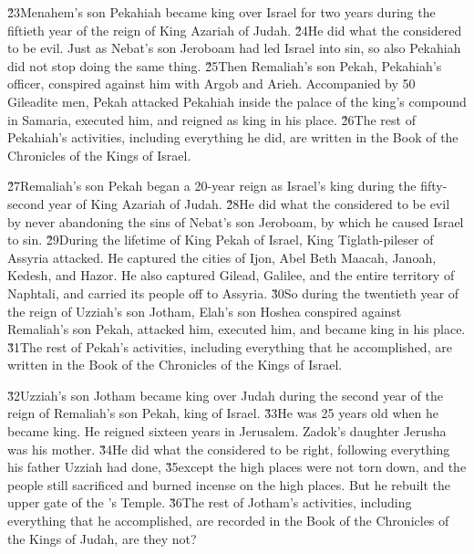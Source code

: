 \v{23}Menahem's son Pekahiah became king over Israel for two years during the fiftieth year of the reign of King Azariah of Judah. \v{24}He did what the  considered to be evil. Just as Nebat's son Jeroboam had led Israel into sin, so also Pekahiah did not stop doing the same thing. \v{25}Then Remaliah's son Pekah, Pekahiah's officer, conspired against him with Argob and Arieh. Accompanied by 50 Gileadite men, Pekah attacked Pekahiah inside the palace of the king's compound in Samaria, executed him, and reigned as king in his place. \v{26}The rest of Pekahiah's activities, including everything he did, are written in the Book of the Chronicles of the Kings of Israel.

\v{27}Remaliah's son Pekah began a 20-year reign as Israel's king during the fifty-second year of King Azariah of Judah. \v{28}He did what the  considered to be evil by never abandoning the sins of Nebat's son Jeroboam, by which he caused Israel to sin. \v{29}During the lifetime of King Pekah of Israel, King Tiglath-pileser of Assyria attacked. He captured the cities of Ijon, Abel Beth Maacah, Janoah, Kedesh, and Hazor. He also captured Gilead, Galilee, and the entire territory of Naphtali, and carried its people off to Assyria. \v{30}So during the twentieth year of the reign of Uzziah's son Jotham, Elah's son Hoshea conspired against Remaliah's son Pekah, attacked him, executed him, and became king in his place. \v{31}The rest of Pekah's activities, including everything that he accomplished, are written in the Book of the Chronicles of the Kings of Israel.

\v{32}Uzziah's son Jotham became king over Judah during the second year of the reign of Remaliah's son Pekah, king of Israel. \v{33}He was 25 years old when he became king. He reigned sixteen years in Jerusalem. Zadok's daughter Jerusha was his mother. \v{34}He did what the  considered to be right, following everything his father Uzziah had done, \v{35}except the high places were not torn down, and the people still sacrificed and burned incense on the high places. But he rebuilt the upper gate of the 's Temple. \v{36}The rest of Jotham's activities, including everything that he accomplished, are recorded in the Book of the Chronicles of the Kings of Judah, are they not?

